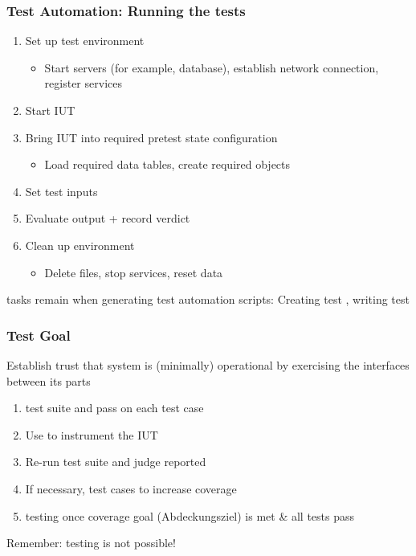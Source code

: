 \subsubsection*{Test Automation: Running the tests}
\begin{defBox}[title=Tasks of Test Automation System]
    \begin{enumerate}
        \item Set up test environment
        \begin{itemize}
            \item Start servers (for example, database), establish network connection, register services
        \end{itemize}
        \item Start IUT
        \item Bring IUT into required pretest state configuration
        \begin{itemize}
            \item Load required data tables, create required objects
        \end{itemize}
        \item Set test inputs
        \item Evaluate output + record verdict
        \item Clean up environment
        \begin{itemize}
            \item Delete files, stop services, reset data
        \end{itemize}
    \end{enumerate}
\end{defBox}
\begin{defBox}
     tasks remain when generating test automation scripts: Creating test , writing test 
\end{defBox}
\subsubsection*{Test Goal}
\begin{defBox}[title=What can be Achieved by Testing?]
    Establish  trust that system is (minimally) operational by exercising the interfaces between its parts
\end{defBox}
 
\begin{enumerate}
    \item {} test suite and pass  on each test case
    \item Use  to instrument the IUT
    \item Re-run test suite and judge reported 
    \item If necessary,  test cases to increase coverage
    \item {} testing once coverage goal (Abdeckungsziel) is met \& all tests pass
\end{enumerate}
\begin{defBox}
    Remember:  testing is not possible!
\end{defBox}
